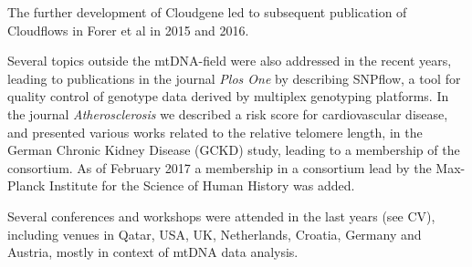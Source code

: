 The further development of Cloudgene led to subsequent publication of Cloudflows in Forer et al\cite{Forer2015,Forer2016} in 2015 and 2016.

Several topics outside the mtDNA-field were also addressed in the recent years, leading to publications in the journal \textit{Plos One} \cite{Weissensteiner2013} by describing SNPflow, a tool for quality control of genotype data derived by multiplex genotyping platforms. In the journal \textit{Atherosclerosis} we described a risk score for cardiovascular disease\cite{Lamina2014}, and presented various works related to the relative telomere length, in the German Chronic Kidney Disease (GCKD) study, leading to a membership of the consortium. As of February 2017 a membership in a consortium lead by the Max-Planck Institute for the Science of Human History was added.

Several conferences and workshops were attended in the last years (see CV), including venues in Qatar, USA, UK, Netherlands, Croatia, Germany and Austria, mostly in context of mtDNA data analysis.

